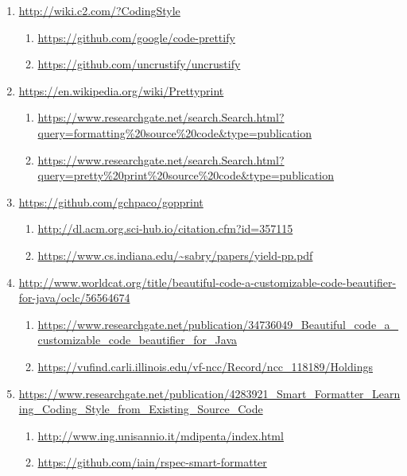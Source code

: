 \begin{sloppypar}
\begin{bluebox}
\begin{enumerate}[leftmargin=*,parsep=0pt]
    \item \url{http://wiki.c2.com/?CodingStyle}
    \begin{enumerate}[nolistsep,topsep=0pt,label=$\star$]
        \item \url{https://github.com/google/code-prettify}
        \item \url{https://github.com/uncrustify/uncrustify}
    \end{enumerate}

    \item \url{https://en.wikipedia.org/wiki/Prettyprint}
    \begin{enumerate}[nolistsep,topsep=0pt,label=$\star$]
        \item \url{https://www.researchgate.net/search.Search.html?query=formatting%20source%20code&type=publication}
        \item \url{https://www.researchgate.net/search.Search.html?query=pretty%20print%20source%20code&type=publication}
    \end{enumerate}

    \item \url{https://github.com/gchpaco/gopprint}
    \begin{enumerate}[nolistsep,topsep=0pt,label=$\star$]
        \item \url{http://dl.acm.org.sci-hub.io/citation.cfm?id=357115}
        \item \url{https://www.cs.indiana.edu/~sabry/papers/yield-pp.pdf}
    \end{enumerate}

    \item \url{http://www.worldcat.org/title/beautiful-code-a-customizable-code-beautifier-for-java/oclc/56564674}
    \begin{enumerate}[nolistsep,topsep=0pt,label=$\star$]
        \item \url{https://www.researchgate.net/publication/34736049_Beautiful_code_a_customizable_code_beautifier_for_Java}
        \item \url{https://vufind.carli.illinois.edu/vf-ncc/Record/ncc_118189/Holdings}
    \end{enumerate}

    \item \url{https://www.researchgate.net/publication/4283921_Smart_Formatter_Learning_Coding_Style_from_Existing_Source_Code}
    \begin{enumerate}[nolistsep,topsep=0pt,label=$\star$]
        \item \url{http://www.ing.unisannio.it/mdipenta/index.html}
        \item \url{https://github.com/iain/rspec-smart-formatter}
    \end{enumerate}


\end{enumerate}
\end{bluebox}
\end{sloppypar}
